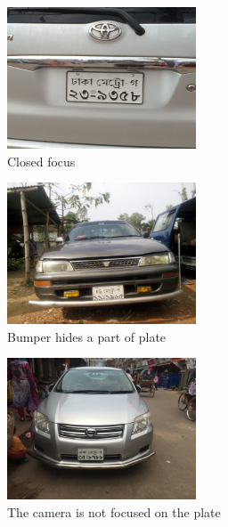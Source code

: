\documentclass{standalone}
\begin{document}
\begin{figure}
    \centering
    \includegraphics[width=0.5\textwidth]{./img/experiment/stage.1/big}
    \caption{Closed focus}
\end{figure}

\begin{figure}
    \centering
    \includegraphics[width=0.5\textwidth]{./img/experiment/stage.1/bumper}
    \caption{Bumper hides a part of plate}
\end{figure}

\begin{figure}
    \centering
    \includegraphics[width=0.5\textwidth]{./img/experiment/stage.1/good}
    \caption{The camera is not focused on the plate}
\end{figure}
\end{document}
